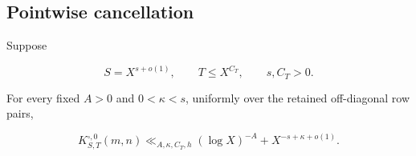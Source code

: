 \subsection{Pointwise cancellation}

\begin{theorem}
\label{thm:tpc26-both-new-zero}
Suppose

\begin{equation}
 S=X^{s+o(1)},
 \qquad T\le X^{C_T},
 \qquad s,C_T>0.
 \label{eq:tpc26-zero-scales}
\end{equation}

For every fixed \(A>0\) and \(0<\kappa<s\), uniformly over the
retained off-diagonal row pairs,

\begin{equation}
 \boxed{
 K^{\square,0}_{S,T}(m,n)
 \ll_{A,\kappa,C_T,h}
 (\log X)^{-A}+X^{-s+\kappa+o(1)}.}
 \label{eq:tpc26-both-new-zero-bound}
\end{equation}
\end{theorem}

